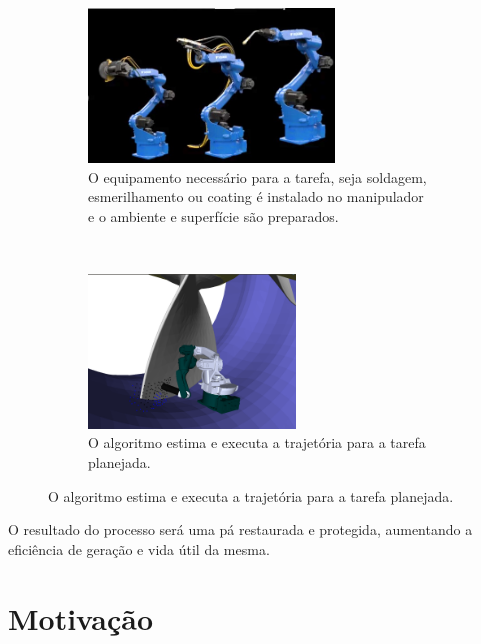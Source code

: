 \begin{figure}[htbp]
\centering
\begin{subfigure}[t]{0.45\textwidth}
\includegraphics[width=\textwidth,
height=4.1cm]{figs/robots_evo} 
\captionsetup{width=0.9\textwidth}
\caption{O equipamento necessário para a tarefa, seja soldagem, esmerilhamento
ou coating é instalado no manipulador e o ambiente e superfície são preparados.}
\label{fig:subim5}
\end{subfigure}
~
\begin{subfigure}[t]{0.45\textwidth}
\includegraphics[width=\textwidth,
height=4.1cm]{figs/footleft}
\caption{O algoritmo estima e executa a trajetória para a tarefa planejada.}
\label{fig:subim6}
\end{subfigure}
\label{fig:image2}
\end{figure}

O resultado do processo será uma pá restaurada e protegida, aumentando a
eficiência de geração e vida útil da mesma. 

\section{Motivação}

